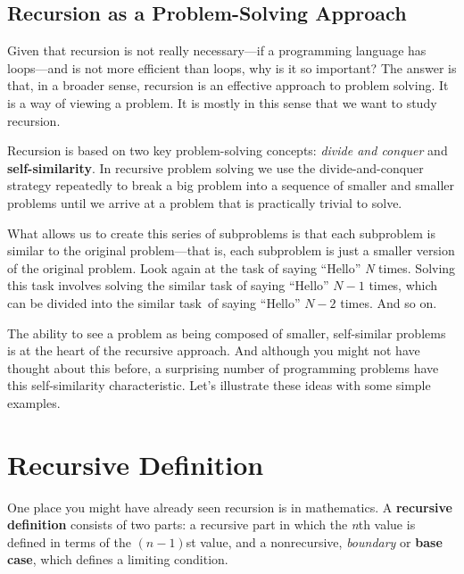 \subsection{Recursion as a Problem-Solving Approach}
\noindent Given that recursion is not really necessary---if a
programming language has loops---and is not more efficient than loops,
why is it so important?  The answer is that, in a broader sense,
recursion is an effective approach to problem solving.  It is a way of
viewing a problem.  It is mostly in this sense that we want to study
recursion.

Recursion is based on two key problem-solving concepts: {\it
divide and conquer} and {\bf
self-similarity}.  In recursive problem solving
we use the divide-and-conquer strategy repeatedly to break a big
problem into a sequence of smaller and smaller problems until we
arrive at a problem that is practically trivial to solve.

What allows us to create this series
of subproblems is that each
subproblem is similar to the original problem---that is, each
subproblem is just a smaller version of the original problem.   Look
again at the task of saying ``Hello'' {\it N} times.  Solving this task
involves solving the similar task of saying ``Hello'' $N-1$ times,
which can be divided into the similar task~of saying ``Hello'' $N-2$
times.  And so on.

The ability to see a problem as being composed of smaller,
self-similar problems is at the heart of the recursive approach.  And
although you might not have thought about this before, a surprising
number of programming problems have this self-similarity
characteristic.   Let's illustrate these ideas with some simple
examples.



\section{Recursive Definition}
\noindent One place you might have already seen recursion is in
mathematics.  A {\bf recursive definition}
consists of two parts: a recursive part in which the {\it n}th value
is defined in terms of the $(n-1)$st value, and a nonrecursive, {\em
boundary} or {\bf base case}, which defines a limiting condition.


